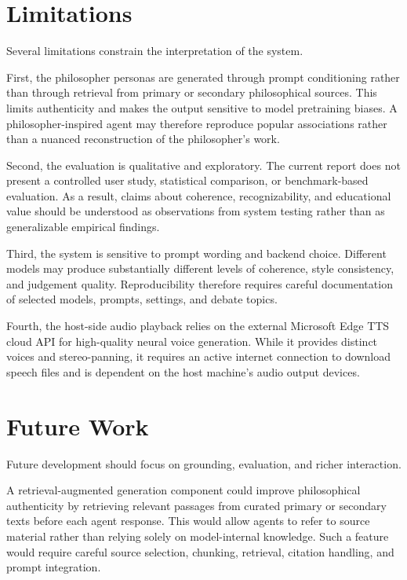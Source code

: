 \documentclass[11pt,a4paper]{article}
\begin{document}
\section{Limitations}

Several limitations constrain the interpretation of the system.

First, the philosopher personas are generated through prompt conditioning rather than through retrieval from primary or secondary philosophical sources. This limits authenticity and makes the output sensitive to model pretraining biases. A philosopher-inspired agent may therefore reproduce popular associations rather than a nuanced reconstruction of the philosopher's work.

Second, the evaluation is qualitative and exploratory. The current report does not present a controlled user study, statistical comparison, or benchmark-based evaluation. As a result, claims about coherence, recognizability, and educational value should be understood as observations from system testing rather than as generalizable empirical findings.

Third, the system is sensitive to prompt wording and backend choice. Different models may produce substantially different levels of coherence, style consistency, and judgement quality. Reproducibility therefore requires careful documentation of selected models, prompts, settings, and debate topics.

Fourth, the host-side audio playback relies on the external Microsoft Edge TTS cloud API for high-quality neural voice generation. While it provides distinct voices and stereo-panning, it requires an active internet connection to download speech files and is dependent on the host machine's audio output devices.

\section{Future Work}

Future development should focus on grounding, evaluation, and richer interaction.

A retrieval-augmented generation component could improve philosophical authenticity by retrieving relevant passages from curated primary or secondary texts before each agent response. This would allow agents to refer to source material rather than relying solely on model-internal knowledge. Such a feature would require careful source selection, chunking, retrieval, citation handling, and prompt integration.
\end{document}

